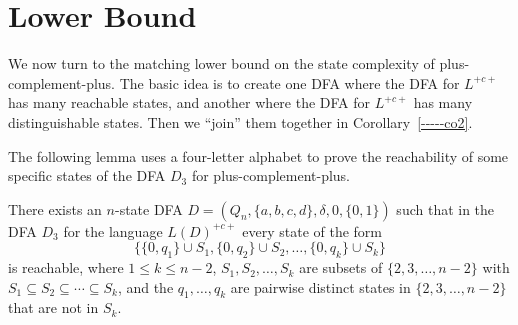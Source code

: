 \documentclass[runningheads]{llncs}
\begin{document}
\section{Lower Bound}
\label{***lower}

We now turn to the matching lower bound on the state complexity
of plus-complement-plus.  The basic idea is to create one DFA
where the DFA for $L^{+c+}$ has many reachable states, and another
where the DFA for $L^{+c+}$ has many distinguishable states.
Then we ``join'' them together in Corollary~\ref{-----co2}.

The following lemma uses a four-letter alphabet 
to prove the reachability of some specific states
of the DFA $D_3$ for plus-complement-plus.

\begin{lemma}\label{-----le3}\label{le:reach}
 There exists an $n$-state
 DFA  $D=(Q_n,\{a,b,c,d\},\delta,0,\{0,1\})$
 such that in the  DFA $D_3$ for the language $L(D)^{+c+}$
 every state of the form
 $$
\Big\{  \{0,q_1\}\cup S_1,  \{0,q_2\}\cup S_2,\ldots, \{0,q_k\}\cup S_k\Big\} 
 $$
 is reachable, 
 where $1\le k \le n-2$, 
 $S_1,S_2,\ldots,S_k$ are subsets of $\{2,3,\ldots,n-2\}$ with
 $S_1\subseteq S_2\subseteq \cdots  \subseteq S_k$, and the
 $q_1,\ldots,q_k$ are pairwise distinct states in $\{2,3,\ldots,n-2\}$
 that are not in $S_k$.
\end{lemma}
\end{document}
